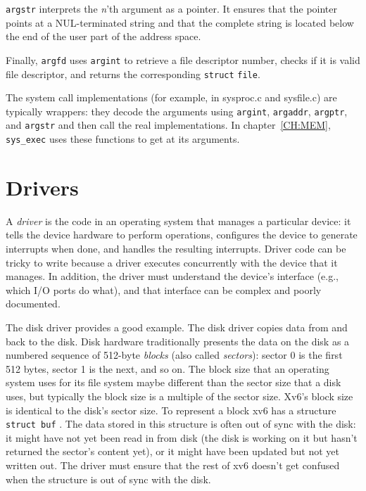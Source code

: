 \lstinline{argstr} 
interprets the
\textit{n}'th 
argument as a pointer.  It ensures that the pointer points at a
NUL-terminated string and that the complete string is located below
the end of the user part of the address space.

Finally,
\lstinline{argfd}
uses
\lstinline{argint}
to retrieve a file descriptor number, checks if it is valid
file descriptor, and returns the corresponding
\lstinline{struct}
\lstinline{file}.

The system call implementations (for example, in sysproc.c and sysfile.c)
are typically wrappers: they decode the arguments using 
\lstinline{argint},
\lstinline{argaddr},
\lstinline{argptr}, 
and 
\lstinline{argstr}
and then call the real implementations.
In chapter~\ref{CH:MEM},
\lstinline{sys_exec}
uses these functions to get at its arguments.

\section{Drivers}

A
\textit{driver}
is the code in an operating system that manages a particular device:
it tells the device hardware to perform operations,
configures the device to generate interrupts when done,
and handles the resulting interrupts.
Driver code can be tricky to write
because a driver executes concurrently with the device that it manages.  In
addition, the driver must understand the device's interface (e.g., which I/O
ports do what), and that interface can be complex and poorly documented.

The disk driver provides a good example.  The disk driver copies data
from and back to the disk.  Disk hardware traditionally presents the data on the
disk as a numbered sequence of 512-byte 
\textit{blocks} 
(also called 
\textit{sectors}): 
sector 0 is the first 512 bytes, sector 1 is the next, and so on. The block size
that an operating system uses for its file system maybe different than the
sector size that a disk uses, but typically the block size is a multiple of the
sector size.  Xv6's block size is identical to the disk's sector size.  To
represent a block xv6 has a structure
\lstinline{struct buf}
.
The
data stored in this structure is often out of sync with the disk: it might have
not yet been read in from disk (the disk is working on it but hasn't returned
the sector's content yet), or it might have been updated but not yet written
out.  The driver must ensure that the rest of xv6 doesn't get confused when the
structure is out of sync with the disk.


